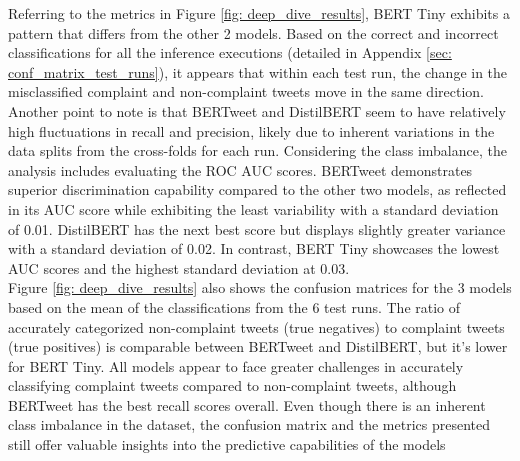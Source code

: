 Referring to the metrics in Figure \ref{fig: deep_dive_results}, BERT Tiny exhibits a pattern that differs from the other 2 models. Based on the correct and incorrect classifications for all the inference executions (detailed in Appendix \ref{sec: conf_matrix_test_runs}), it appears that within each test run, the change in the misclassified complaint and non-complaint tweets move in the same direction. Another point to note is that BERTweet and DistilBERT seem to have relatively high fluctuations in recall and precision, likely due to inherent variations in the data splits from the cross-folds for each run. Considering the class imbalance, the analysis includes evaluating the ROC AUC scores. BERTweet demonstrates superior discrimination capability compared to the other two models, as reflected in its AUC score while exhibiting the least variability with a standard deviation of 0.01. DistilBERT has the next best score but displays slightly greater variance with a standard deviation of 0.02. In contrast, BERT Tiny showcases the lowest AUC scores and the highest standard deviation at 0.03.\\

Figure \ref{fig: deep_dive_results} also shows the confusion matrices for the 3 models based on the mean of the classifications from the 6 test runs. The ratio of accurately categorized non-complaint tweets (true negatives) to complaint tweets (true positives) is comparable between BERTweet and DistilBERT, but it's lower for BERT Tiny. All models appear to face greater challenges in accurately classifying complaint tweets compared to non-complaint tweets, although BERTweet has the best recall scores overall. Even though there is an inherent class imbalance in the dataset, the confusion matrix and the metrics presented still offer valuable insights into the predictive capabilities of the models\\

